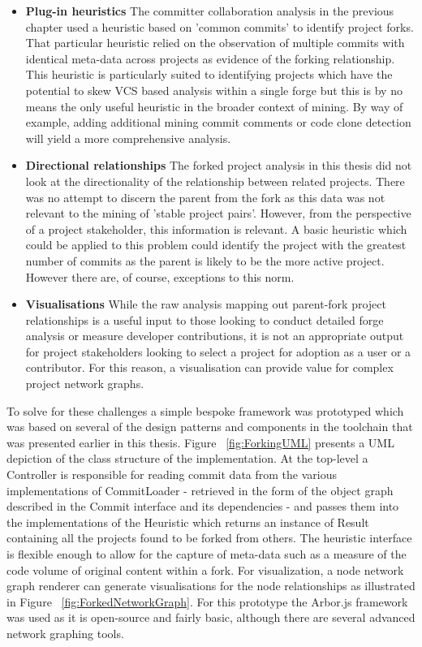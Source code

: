 \begin{itemize}
\item  \textbf{Plug-in heuristics} The committer collaboration analysis in the previous chapter used a heuristic based on 'common commits' to identify project forks. That particular heuristic relied on the observation of multiple commits with identical meta-data across projects as evidence of the forking relationship. This heuristic is particularly suited to identifying projects which have the potential to skew VCS based analysis within a single forge but this is by no means the only useful heuristic in the broader context of mining. By way of example, adding additional mining commit comments or code clone detection will yield a more comprehensive analysis.
\item  \textbf{Directional relationships} The forked project analysis in this thesis did not look at the directionality of the relationship between related projects. There was no attempt to discern the parent from the fork as this data was not relevant to the mining of 'stable project pairs'. However, from the perspective of a project stakeholder, this information is relevant. A basic heuristic which could be applied to this problem could identify the project with the greatest number of commits as the parent is likely to be the more active project. However there are, of course, exceptions to this norm.
\item  \textbf{Visualisations} While the raw analysis mapping out parent-fork project relationships is a useful input to those looking to conduct detailed forge analysis or measure developer contributions, it is not an appropriate output for project stakeholders looking to select a project for adoption as a user or a contributor. For this reason, a visualisation can provide value for complex project network graphs.
\end{itemize}

To solve for these challenges a simple bespoke framework was prototyped which was based on several of the design patterns and components in the toolchain that was presented earlier in this thesis. Figure ~\ref{fig:ForkingUML} presents a UML depiction of the class structure of the implementation. At the top-level a Controller is responsible for reading commit data from the various implementations of CommitLoader - retrieved in the form of the object graph described in the Commit interface and its dependencies - and passes them into the implementations of the Heuristic which returns an instance of Result containing all the projects found to be forked from others. The heuristic interface is flexible enough to allow for the capture of meta-data such as a measure of the code volume of original content within a fork. For visualization, a node network graph renderer can generate visualisations for the node relationships as illustrated in Figure ~\ref{fig:ForkedNetworkGraph}. For this prototype the Arbor.js framework was used as it is open-source and fairly basic, although there are several advanced network graphing tools. 


